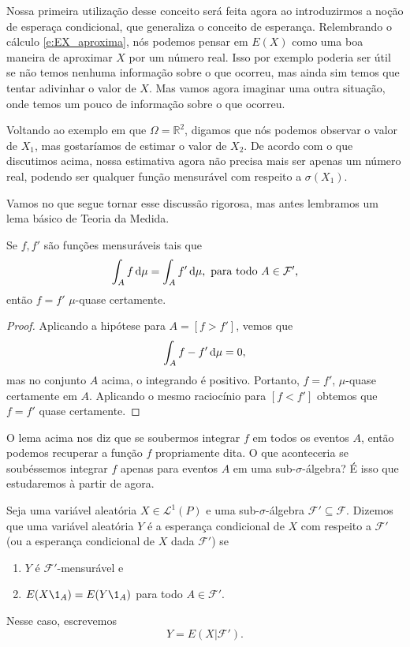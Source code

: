 Nossa primeira utilização desse conceito será feita agora ao introduzirmos a noção de esperaça condicional, que generaliza o conceito de esperança.
Relembrando o cálculo \eqref{e:EX_aproxima}, nós podemos pensar em $E(X)$ como uma boa maneira de aproximar $X$ por um número real.
Isso por exemplo poderia ser útil se não temos nenhuma informação sobre o que ocorreu, mas ainda sim temos que tentar adivinhar o valor de $X$.
Mas vamos agora imaginar uma outra situação, onde temos um pouco de informação sobre o que ocorreu.

Voltando ao exemplo em que $\Omega = \mathbb{R}^2$, digamos que nós podemos observar o valor de $X_1$, mas gostaríamos de estimar o valor de $X_2$.
De acordo com o que discutimos acima, nossa estimativa agora não precisa mais ser apenas um número real, podendo ser qualquer função mensurável com respeito a $\sigma(X_1)$.

Vamos no que segue tornar esse discussão rigorosa, mas antes lembramos um lema básico de Teoria da Medida.

\begin{lemma}
  \label{l:f_igual_fp}
  Se $f, f'$ são funções mensuráveis tais que
  \begin{equation}
    \int_A f \mathop{}\!\mathrm{d} \mu = \int_A f' \mathop{}\!\mathrm{d} \mu, \text{ para todo $A \in \mathcal{F}'$,}
  \end{equation}
  então $f = f'$ $\mu$-quase certamente.
\end{lemma}

\begin{proof}
  Aplicando a hipótese para $A = [f > f']$, vemos que
  \begin{equation}
    \int_A f - f' \mathop{}\!\mathrm{d} \mu = 0,
  \end{equation}
  mas no conjunto $A$ acima, o integrando é positivo.
  Portanto, $f = f'$, $\mu$-quase certamente em $A$.
  Aplicando o mesmo raciocínio para $[f < f']$ obtemos que $f = f'$ quase certamente.
\end{proof}

O lema acima nos diz que se soubermos integrar $f$ em todos os eventos $A$, então podemos recuperar a função $f$ propriamente dita.
O que aconteceria se soubéssemos integrar $f$ apenas para eventos $A$ em uma sub-$\sigma$-álgebra?
É isso que estudaremos à partir de agora.

\begin{definition}
  \label{d:esperanca_condicional}
  Seja uma variável aleatória $X \in \mathcal{L}^1(P)$ e uma sub-$\sigma$-álgebra $\mathcal{F}' \subseteq \mathcal{F}$.
  Dizemos que uma variável aleatória $Y$ é a esperança condicional  de $X$ com respeito a $\mathcal{F}'$ (ou a esperança condicional de $X$ dada $\mathcal{F}'$) se
  \begin{enumerate}[\quad a)]
  \item $Y$ é $\mathcal{F}'$-mensurável e
  \item $E(X \1_{A}) = E(Y \1_{A})$ para todo $A \in \mathcal{F}'$.
  \end{enumerate}
  Nesse caso, escrevemos
  \begin{equation}
    Y = E(X | \mathcal{F}').
  \end{equation}
\end{definition}

